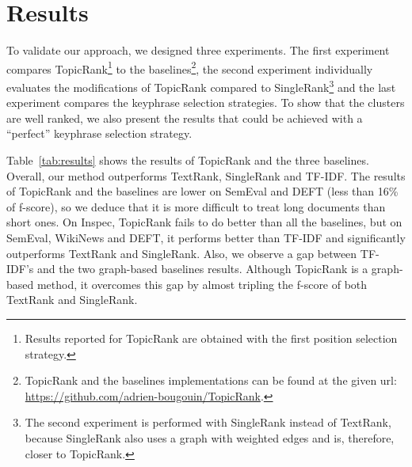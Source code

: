 \section{Results}
\label{sec:results}
  To validate our approach, we designed three experiments. The first experiment
  compares TopicRank\footnote{Results reported for TopicRank are obtained with
  the first position selection strategy.} to the baselines\footnote{TopicRank
  and the baselines implementations can be found at the given url:
  \url{https://github.com/adrien-bougouin/TopicRank}.}, the second experiment
  individually evaluates the modifications of TopicRank compared to
  SingleRank\footnote{The second experiment is performed with SingleRank instead
  of TextRank, because SingleRank also uses a graph with weighted edges and is,
  therefore, closer to TopicRank.} and the last experiment compares the
  keyphrase selection strategies. To show that the clusters are well ranked, we
  also present the results that could be achieved with a ``perfect'' keyphrase
  selection strategy.

  Table~\ref{tab:results} shows the results of TopicRank and the three
  baselines. Overall, our method outperforms TextRank, SingleRank and TF-IDF.
  The results of TopicRank and the baselines are lower on SemEval and DEFT (less
  than 16\% of f-score), so we deduce that it is more difficult to treat long
  documents than short ones. On Inspec, TopicRank fails to do better than all
  the baselines, but on SemEval, WikiNews and DEFT, it performs better than
  TF-IDF and significantly outperforms TextRank and SingleRank. Also, we observe
  a gap between TF-IDF's and the two graph-based baselines results. Although
  TopicRank is a graph-based method, it overcomes this gap by almost tripling
  the f-score of both TextRank and SingleRank.

